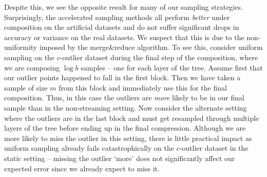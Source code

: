 Despite this, we see the opposite result for many of our sampling strategies. Surprisingly, the accelerated sampling methods all perform \emph{better} under
composition on the artificial datasets and do not suffer significant drops in accuracy or variance on the real datasets. We suspect that this is due to the
non-uniformity imposed by the merge\&reduce algorithm. To see this, consider uniform sampling on the $c$-outlier dataset during the final step of the
composition, where we are composing $\log b$ samples -- one for each layer of the tree. Assume first that our outlier points happened to fall in the first
block. Then we have taken a sample of size $m$ from this block and immediately use this for the final composition. Thus, in this case the outliers are
\emph{more} likely to be in our final sample than in the non-streaming setting. Now consider the alternate setting where the outliers are in the last block and
must get resampled through multiple layers of the tree before ending up in the final compression. Although we are more likely to miss the outlier in this
setting, there is little practical impact as uniform sampling already fails catastrophically on the $c$-outlier dataset in the static setting -- missing the
outlier `more' does not significantly affect our expected error since we already expect to miss it.


